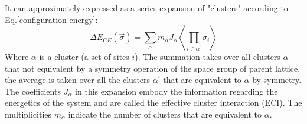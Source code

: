 \documentclass[aps,preprint,amsmath,amssymb]{revtex4}
\begin{document}
It can approximately expressed as a series expansion of "clusters" according to Eq.\ref{configuration-energy}:
\begin{equation}\label{CE}
  \Delta E_{CE}(\vec{\sigma})=\sum_{\alpha}m_{\alpha}J_{\alpha}\left\langle\prod_{i\in\alpha^{'}}\sigma_{i}\right\rangle
\end{equation}
Where $\alpha$ is a cluster (a set of sites $i$). The summation takes over all clusters $\alpha$ that not equivalent
by a symmetry operation of the space group of parent lattice,
the average is taken over all the clusters $\alpha^{'}$ that are equivalent to $\alpha$
by symmetry. The coefficients $J_{\alpha}$ in this expansion embody the information regarding
the energetics of the system and are called the effective
cluster interaction (ECI). The multiplicities $m_{\alpha}$ indicate the number of clusters that are equivalent to $\alpha$.
\end{document}
